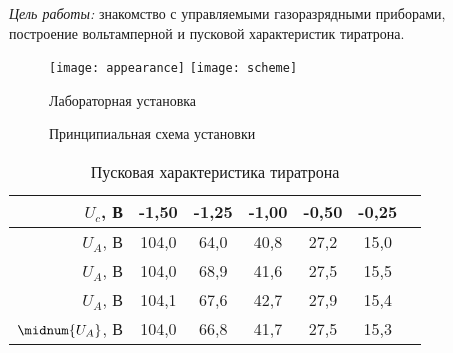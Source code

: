 \documentclass[10pt,pscyr,nonums]{hedlab}
\begin{document}
    \makeheader

    \emph{Цель работы:} знакомство с управляемыми газоразрядными приборами,
    построение вольтамперной и пусковой характеристик тиратрона.
    
    \begin{figure}[h!]
        \center
        \texttt{[image: appearance]} \hspace*{2em}
        \texttt{[image: scheme]}
        \parbox{.37\textwidth}{\caption{Лабораторная установка}}
        \hspace*{2em}
        \parbox{.45\textwidth}{\caption{Принципиальная схема установки}}
    \end{figure}
    
    \begin{table}[h!]
        \center
        \caption{Пусковая характеристика тиратрона}
        \begin{tabular}{|r|*{6}{C{.07}|}} \hline
            \( U_c \), В & -1,50 & -1,25 & -1,00 & -0,50 & -0,25 \\ \hline
            \( U_A \), В & 104,0 & 64,0 & 40,8 & 27,2 & 15,0 \\ \hline
            \( U_A \), В & 104,0 & 68,9 & 41,6 & 27,5 & 15,5 \\ \hline
            \( U_A \), В & 104,1 & 67,6 & 42,7 & 27,9 & 15,4 \\ \hline
            \( \midnum{U_A} \), В & 104,0 & 66,8 & 41,7 & 27,5 & 15,3 \\ \hline
        \end{tabular}
    \end{table}
    
\end{document}
